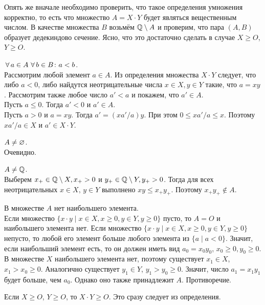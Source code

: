 \documentclass[a4paper,12pt]{article}
\begin{document}
\bigskip
Опять же вначале необходимо проверить, что такое определения умножения корректно, то есть что множество $A = X\cdot Y$ будет являться вещественным числом. В качестве множества $B$ возьмём $\mathbb{Q} \setminus A$ и проверим, что пара $(A,B)$ образует дедекиндово сечение. Ясно, что это достаточно сделать в случае $X \ge O$, $Y \ge O$.
\begin{nums}{-3}
\item
$\,\forall\, a\in A \, \,\forall\, b \in B \colon a < b$.\\
Рассмотрим любой элемент $a\in A$. Из определения множества $X\cdot Y$ следует, что либо $a<0$, либо найдутся неотрицательные числа $x\in X, y\in Y$ такие, что $a = xy$. Рассмотрим также любое число $a' < a$ и покажем, что $a' \in A$.\\
Пусть $a \le 0$. Тогда $a' < 0$ и $a' \in A$.\\
Пусть $a > 0$ и $a = xy$. Тогда $a' = (xa'/a)y$. При этом $0 \le xa'/a \le x$. Поэтому $xa'/a \in X$ и $a' \in X\cdot Y$.
\item
$A \ne \varnothing$.\\
Очевидно.
\item
$A \ne \mathbb{Q}$.\\
Выберем $x_+ \in \mathbb{Q}\setminus X, x_+ > 0$ и $y_+ \in \mathbb{Q}\setminus Y, y_+ > 0$. Тогда для всех неотрицательных $x\in X,\,y\in Y$ выполнено $xy \le x_+ y_+$. Поэтому $x_+ y_+ \not\in A$.
\item
В множестве $A$ нет наибольшего элемента.\\
Если множество $\{x \cdot y \mid x\in X, x \ge 0, y\in Y, y\ge 0\}$ пусто, то $A = O$ и наибольшего элемента нет.
Если множество $\{x \cdot y \mid x\in X, x \ge 0, y\in Y, y\ge 0\}$ непусто, то любой его элемент больше любого элемента из $\{a \mid a<0\}$. Значит, если наибольший элемент есть, то он должен иметь вид $a_0 = x_0 y_0$, $x_0 \ge 0, y_0 \ge 0$. В множестве $X$ наибольшего элемента нет, поэтому существует $x_1 \in X$, $x_1 > x_0 \ge 0$. Аналогично существует $y_1 \in Y$, $y_1 > y_0 \ge 0$. Значит, число $a_1 = x_1y_1$ будет больше, чем $a_0$. Однако оно также принадлежит $A$. Противоречие.
\end{nums}

\label{positivity}
Если $X\ge O$, $Y\ge O$, то $X\cdot Y \ge O$. Это сразу следует из определения.
\end{document}
